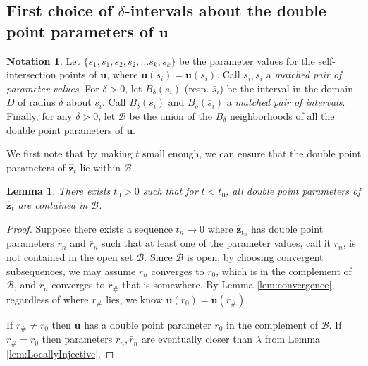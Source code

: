 \documentclass[12pt]{article}
\numberwithin{equation}{subsection}
\newtheorem{lem}{Lemma}[thm]
\theoremstyle{definition}
\newtheorem*{no}{Notation}
\numberwithin{lem}{section}
\def\uu{\mathbf{u}}
\def\zz{\mathbf{z}}
\def\zhat{\mathbf{\hat{z}}}
\begin{document}

\subsection{First choice of $\delta$-intervals about the double point parameters of $\uu$}
\label{FirstDelta}
\begin{no} 
Let $\{s_1, \bar{s}_1, s_2, \bar{s}_2, \ldots s_k, \bar{s}_k\}$ be the parameter values for the self-intersection points of $\uu$, where $\uu(s_i) = \uu(\bar{s}_i)$.  Call $s_i, \bar{s}_i$ a {\em matched pair of parameter values}. For $\delta>0$, let $B_\delta(s_i)$ (resp. $\bar{s}_i$) be the interval in the domain $D$ of radius $\delta$ about $s_i$. Call $B_\delta(s_i)$ and $B_\delta(\bar{s}_i)$ a {\em matched pair of intervals}.  Finally, for any $\delta>0$, let $\mathscr{B}$ be the union of the $B_\delta$ neighborhoods of all the double point parameters of $\uu$. 
\end{no}

We first note that by making $t$ small enough, we can ensure that the double point parameters of $\zhat_t$ lie within $\mathscr{B}$. 

\begin{lem}
\label{lem:AllDPPinB}
There exists $t_0>0$ such that for $t<t_0$, all double point parameters of $\zhat_t$ are contained in $\mathscr{B}$.
\end{lem}

\begin{proof}
  
Suppose  there exists a sequence $t_n \rightarrow 0$ where $\hat{\zz}_{t_n}$ has double point parameters $r_n$ and $\bar{r}_n$ such that at least one of the parameter values, call it $r_n$, is not contained in the open set $\mathscr{B}$.  Since $\mathscr{B}$ is open, by choosing convergent subsequences, we may assume $r_n$ converges to $r_0$, which is in the complement of $\mathscr{B}$, and $\bar{r}_n$ converges to $r_\#$ that is somewhere. By Lemma \ref{lem:convergence}, regardless of where $r_\#$ lies, we know $\uu(r_0) = \uu(r_\#)$.

If $r_\# \neq r_0$ then $\uu$ has a double point parameter $r_0$ in the complement of $\mathscr{B}$. If $r_\# = r_0$ then parameters $r_n, \bar{r}_n$ are eventually closer than $\lambda$ from Lemma \ref{lem:LocallyInjective}.
\end{proof}
\end{document}
